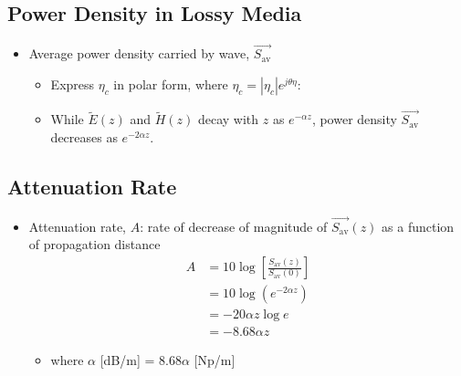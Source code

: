 \documentclass[a4paper]{article}
\begin{document}
\subsection{Power Density in Lossy Media}
\begin{itemize}
    \item Average power density carried by wave, $\overrightarrow{S_\text{av}}$
    \begin{center}
    \end{center}
    \begin{itemize}[label=$\circ$]
        \item Express $\eta_c$ in polar form, where $\eta_c = |\eta_c|e^{j\theta\eta}$:
        \begin{center}
        \end{center}
        \item While $\widetilde{E}(z)$ and $\widetilde{H}(z)$ decay with $z$ as $e^{-\alpha z}$, power density $\overrightarrow{S_\text{av}}$ decreases as $e^{-2\alpha z}$.
    \end{itemize}
\end{itemize}

\subsection{Attenuation Rate}
\begin{itemize}
    \item Attenuation rate, $A$: rate of decrease of magnitude of $\overrightarrow{S_\text{av}}(z)$ as a function of propagation distance
    \begin{align*}
        A &= 10\log\left[\frac{S_\text{av}(z)}{S_\text{av}(0)}\right]\\
        &= 10\log(e^{-2\alpha z})\\
        &= -20\alpha z\log e\\
        &= -8.68\alpha z
    \end{align*}
    \begin{itemize}[label=$\circ$]
        \item where $\alpha$ [dB/m] = $8.68\alpha$ [Np/m]
    \end{itemize}
\end{itemize}
\end{document}
